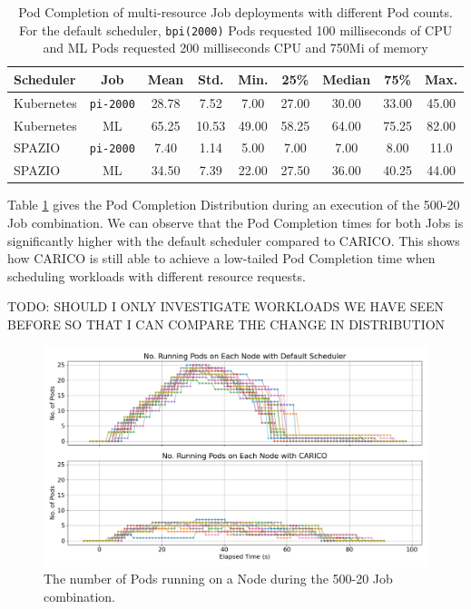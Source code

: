 \begin{table}[H]
\centering
    \begin{tabular}{|l|c|c|c|c|c|c|c|c|}
    \hline
        \bfseries Scheduler & \bfseries Job & \bfseries Mean & \bfseries Std. &
        \bfseries Min. & \bfseries 25\% & \bfseries Median & \bfseries 75\% & \bfseries Max. \\
    \hline
        Kubernetes & \texttt{pi-2000} & 28.78 & 7.52 & 7.00 & 27.00 & 30.00 & 33.00 & 45.00 \\
        Kubernetes & ML & 65.25 & 10.53 & 49.00 & 58.25 & 64.00 & 75.25 & 82.00 \\
        SPAZIO & \texttt{pi-2000} & 7.40 & 1.14 & 5.00 & 7.00 & 7.00 & 8.00 & 11.0 \\
        SPAZIO & ML & 34.50 & 7.39 & 22.00 & 27.50 & 36.00 & 40.25 & 44.00 \\
    \hline
    \end{tabular}
    \caption{Pod Completion of multi-resource Job deployments with different Pod
    counts. For the default scheduler, \texttt{bpi(2000)} Pods requested 100
    milliseconds of CPU and ML Pods requested 200 milliseconds CPU and 750Mi of
    memory}
    \label{tab:mixed-pod-completions}
\end{table}

Table \ref{tab:mixed-pod-completions} gives the Pod Completion Distribution
during an execution of the 500-20 Job combination. We can observe that the
Pod Completion times for both Jobs is significantly higher with the default
scheduler compared to CARICO. This shows how CARICO is still able to achieve a
low-tailed Pod Completion time when scheduling workloads with different resource
requests.

TODO: SHOULD I ONLY INVESTIGATE WORKLOADS WE HAVE SEEN BEFORE SO THAT I CAN
COMPARE THE CHANGE IN DISTRIBUTION

\begin{figure}[H]
    \centering
    \includegraphics[width=\textwidth]{images/mixed-running-pods.png}
    \caption{The number of Pods running on a Node during the
    500-20 Job combination.}
    \label{fig:mixed-pod-running}
\end{figure}


